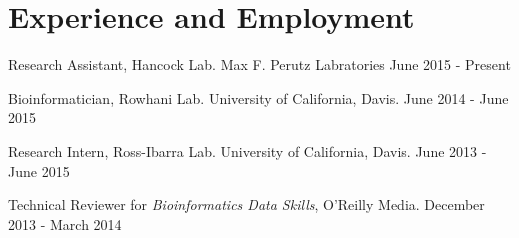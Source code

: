 \documentclass[letterpaper]{article}
\renewenvironment{itemize}{
  \begin{list}{}{
    \setlength{\leftmargin}{1em}
  }
}{
  \end{list}
}
\begin{document}
\section*{Experience and Employment}
\begin{itemize}
\item Research Assistant, Hancock Lab. Max F. Perutz Labratories \hfill June 2015 - Present
\item Bioinformatician, Rowhani Lab. University of California, Davis. \hfill June 2014 - June 2015
\item Research Intern, Ross-Ibarra Lab. University of California, Davis. \hfill June 2013 - June 2015
\item Technical Reviewer for \textit{Bioinformatics Data Skills}, O'Reilly Media. \hfill December 2013 - March 2014

\end{itemize}
\end{document}
